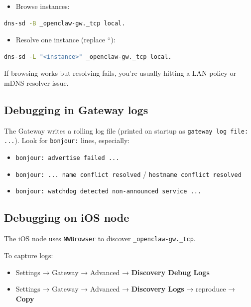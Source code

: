 \begin{itemize}
  \item Browse instances:
\end{itemize}


\begin{lstlisting}[language=bash]
  dns-sd -B _openclaw-gw._tcp local.
\end{lstlisting}


\begin{itemize}
  \item Resolve one instance (replace ``):
\end{itemize}


\begin{lstlisting}[language=bash]
  dns-sd -L "<instance>" _openclaw-gw._tcp local.
\end{lstlisting}


If browsing works but resolving fails, you’re usually hitting a LAN policy or
mDNS resolver issue.

\subsection{Debugging in Gateway logs}


The Gateway writes a rolling log file (printed on startup as
\texttt{gateway log file: ...}). Look for \texttt{bonjour:} lines, especially:

\begin{itemize}
  \item \texttt{bonjour: advertise failed ...}
  \item \texttt{bonjour: ... name conflict resolved} / \texttt{hostname conflict resolved}
  \item \texttt{bonjour: watchdog detected non-announced service ...}
\end{itemize}


\subsection{Debugging on iOS node}


The iOS node uses \texttt{NWBrowser} to discover \texttt{\_openclaw-gw.\_tcp}.

To capture logs:

\begin{itemize}
  \item Settings → Gateway → Advanced → \textbf{Discovery Debug Logs}
  \item Settings → Gateway → Advanced → \textbf{Discovery Logs} → reproduce → \textbf{Copy}
\end{itemize}


